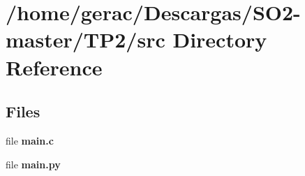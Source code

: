 \section{/home/gerac/\+Descargas/\+S\+O2-\/master/\+T\+P2/src Directory Reference}
\label{dir_68267d1309a1af8e8297ef4c3efbcdba}
\subsection*{Files}
\begin{DoxyCompactItemize}
\item 
file \textbf{ main.\+c}
\item 
file \textbf{ main.\+py}
\end{DoxyCompactItemize}
